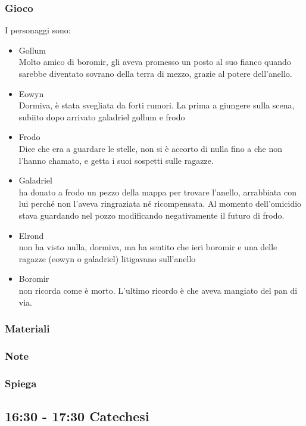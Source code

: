 \documentclass[../main.tex]{subfiles}
\begin{document}
        \subsubsection{Gioco}
        I personaggi sono:
        \begin{itemize}
            \item Gollum\\Molto amico di boromir, gli aveva promesso un posto al suo fianco quando sarebbe diventato sovrano della terra di mezzo, grazie al potere dell’anello.
            \item Eowyn\\Dormiva, è stata svegliata da forti rumori. La prima a giungere sulla scena, subiito dopo arrivato galadriel gollum e frodo
            \item Frodo\\Dice che era a guardare le stelle, non si è accorto di nulla fino a che non l’hanno chamato, e getta i suoi sospetti sulle ragazze. 
            \item Galadriel\\ha donato a frodo un pezzo della mappa per trovare l’anello, arrabbiata con lui perché non l’aveva ringraziata né ricompensata. Al momento dell’omicidio stava guardando nel pozzo modificando negativamente il futuro di frodo.
            \item Elrond\\non ha visto nulla, dormiva, ma ha sentito che ieri boromir e una delle ragazze (eowyn o galadriel) litigavano sull’anello
            \item Boromir\\non ricorda come è morto. L’ultimo ricordo è che aveva mangiato del pan di via. 
        \end{itemize}
        \subsubsection{Materiali}
       \subsubsection{Note}
       \subsubsection{Spiega}
       
    \subsection{16:30 - 17:30 Catechesi}   
\end{document}
